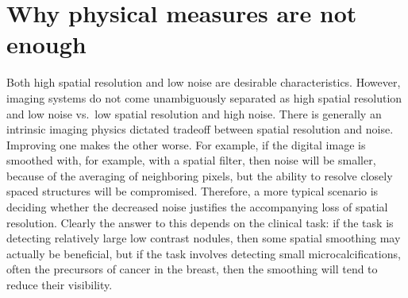\documentclass[
]{book}
\begin{document}
\hypertarget{why-physical-measures-are-not-enough}{%
\section{Why physical measures are not enough}\label{why-physical-measures-are-not-enough}}

Both high spatial resolution and low noise are desirable characteristics. However, imaging systems do not come unambiguously separated as high spatial resolution and low noise vs.~low spatial resolution and high noise. There is generally an intrinsic imaging physics dictated tradeoff between spatial resolution and noise. Improving one makes the other worse. For example, if the digital image is smoothed with, for example, with a spatial filter, then noise will be smaller, because of the averaging of neighboring pixels, but the ability to resolve closely spaced structures will be compromised. Therefore, a more typical scenario is deciding whether the decreased noise justifies the accompanying loss of spatial resolution. Clearly the answer to this depends on the clinical task: if the task is detecting relatively large low contrast nodules, then some spatial smoothing may actually be beneficial, but if the task involves detecting small microcalcifications, often the precursors of cancer in the breast, then the smoothing will tend to reduce their visibility.
\end{document}
